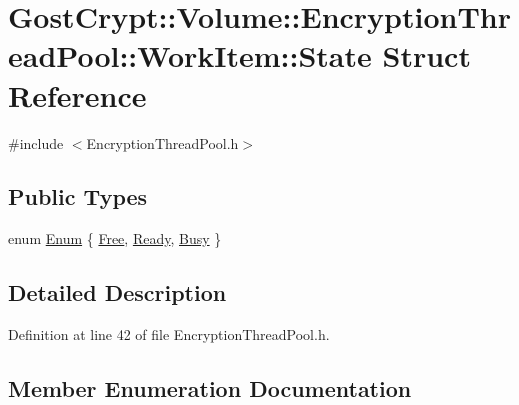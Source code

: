 \hypertarget{struct_gost_crypt_1_1_volume_1_1_encryption_thread_pool_1_1_work_item_1_1_state}{}\section{Gost\+Crypt\+:\+:Volume\+:\+:Encryption\+Thread\+Pool\+:\+:Work\+Item\+:\+:State Struct Reference}
\label{struct_gost_crypt_1_1_volume_1_1_encryption_thread_pool_1_1_work_item_1_1_state}


{\ttfamily \#include $<$Encryption\+Thread\+Pool.\+h$>$}

\subsection*{Public Types}
\begin{DoxyCompactItemize}
\item 
enum \hyperlink{struct_gost_crypt_1_1_volume_1_1_encryption_thread_pool_1_1_work_item_1_1_state_ac04abd9f32938c76d4689c46dfa85f08}{Enum} \{ \hyperlink{struct_gost_crypt_1_1_volume_1_1_encryption_thread_pool_1_1_work_item_1_1_state_ac04abd9f32938c76d4689c46dfa85f08a25cf94e9195339b1cdd5603c6217fa49}{Free}, 
\hyperlink{struct_gost_crypt_1_1_volume_1_1_encryption_thread_pool_1_1_work_item_1_1_state_ac04abd9f32938c76d4689c46dfa85f08aba0bc999e106829d62966ff478921fc9}{Ready}, 
\hyperlink{struct_gost_crypt_1_1_volume_1_1_encryption_thread_pool_1_1_work_item_1_1_state_ac04abd9f32938c76d4689c46dfa85f08ad0ffc518bd250efde4a4ace887fecab4}{Busy}
 \}
\end{DoxyCompactItemize}


\subsection{Detailed Description}


Definition at line 42 of file Encryption\+Thread\+Pool.\+h.



\subsection{Member Enumeration Documentation}
\mbox{\label{struct_gost_crypt_1_1_volume_1_1_encryption_thread_pool_1_1_work_item_1_1_state_ac04abd9f32938c76d4689c46dfa85f08}} 
